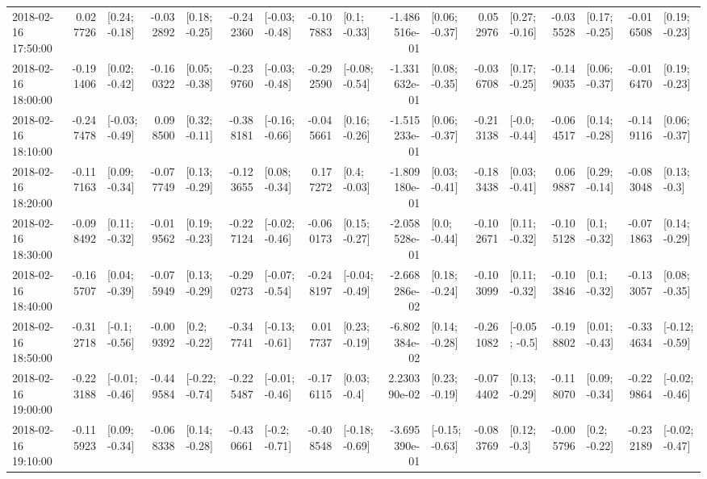 \begin{tabular}{lrlrlrlrlrlrlrlrl}
2018-02-16 17:50:00 &  0.027726 &   [0.24; -0.18] & -0.032892 &   [0.18; -0.25] & -0.242360 &  [-0.03; -0.48] & -0.107883 &    [0.1; -0.33] & -1.486516e-01 &   [0.06; -0.37] &  0.052976 &   [0.27; -0.16] & -0.035528 &   [0.17; -0.25] & -0.016508 &   [0.19; -0.23] \\
2018-02-16 18:00:00 & -0.191406 &   [0.02; -0.42] & -0.160322 &   [0.05; -0.38] & -0.239760 &  [-0.03; -0.48] & -0.292590 &  [-0.08; -0.54] & -1.331632e-01 &   [0.08; -0.35] & -0.036708 &   [0.17; -0.25] & -0.149035 &   [0.06; -0.37] & -0.016470 &   [0.19; -0.23] \\
2018-02-16 18:10:00 & -0.247478 &  [-0.03; -0.49] &  0.098500 &   [0.32; -0.11] & -0.388181 &  [-0.16; -0.66] & -0.045661 &   [0.16; -0.26] & -1.515233e-01 &   [0.06; -0.37] & -0.213138 &   [-0.0; -0.44] & -0.064517 &   [0.14; -0.28] & -0.149116 &   [0.06; -0.37] \\
2018-02-16 18:20:00 & -0.117163 &   [0.09; -0.34] & -0.077749 &   [0.13; -0.29] & -0.123655 &   [0.08; -0.34] &  0.177272 &    [0.4; -0.03] & -1.809180e-01 &   [0.03; -0.41] & -0.183438 &   [0.03; -0.41] &  0.069887 &   [0.29; -0.14] & -0.083048 &    [0.13; -0.3] \\
2018-02-16 18:30:00 & -0.098492 &   [0.11; -0.32] & -0.019562 &   [0.19; -0.23] & -0.227124 &  [-0.02; -0.46] & -0.060173 &   [0.15; -0.27] & -2.058528e-01 &    [0.0; -0.44] & -0.102671 &   [0.11; -0.32] & -0.105128 &    [0.1; -0.32] & -0.071863 &   [0.14; -0.29] \\
2018-02-16 18:40:00 & -0.165707 &   [0.04; -0.39] & -0.075949 &   [0.13; -0.29] & -0.290273 &  [-0.07; -0.54] & -0.248197 &  [-0.04; -0.49] & -2.668286e-02 &   [0.18; -0.24] & -0.103099 &   [0.11; -0.32] & -0.103846 &    [0.1; -0.32] & -0.133057 &   [0.08; -0.35] \\
2018-02-16 18:50:00 & -0.312718 &   [-0.1; -0.56] & -0.009392 &    [0.2; -0.22] & -0.347741 &  [-0.13; -0.61] &  0.017737 &   [0.23; -0.19] & -6.802384e-02 &   [0.14; -0.28] & -0.261082 &   [-0.05; -0.5] & -0.198802 &   [0.01; -0.43] & -0.334634 &  [-0.12; -0.59] \\
2018-02-16 19:00:00 & -0.223188 &  [-0.01; -0.46] & -0.449584 &  [-0.22; -0.74] & -0.225487 &  [-0.01; -0.46] & -0.176115 &    [0.03; -0.4] &  2.230390e-02 &   [0.23; -0.19] & -0.074402 &   [0.13; -0.29] & -0.118070 &   [0.09; -0.34] & -0.229864 &  [-0.02; -0.46] \\
2018-02-16 19:10:00 & -0.115923 &   [0.09; -0.34] & -0.068338 &   [0.14; -0.28] & -0.430661 &   [-0.2; -0.71] & -0.408548 &  [-0.18; -0.69] & -3.695390e-01 &  [-0.15; -0.63] & -0.083769 &    [0.12; -0.3] & -0.005796 &    [0.2; -0.22] & -0.232189 &  [-0.02; -0.47] \\

\end{tabular}
